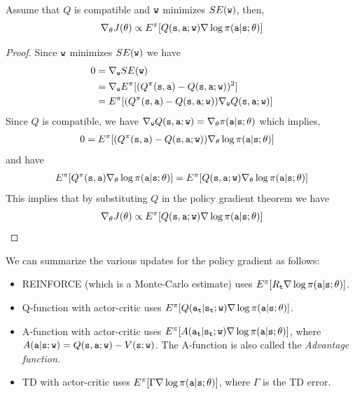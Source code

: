 \begin{theorem}
Assume that $Q$ is compatible and ${\tt w}$ minimizes $SE({\tt w})$,
then,
\[
\nabla_\theta J(\theta)\propto E^\pi[Q({\tt s},{\tt a};{\tt w})
\nabla \log \pi({\tt a}|{\tt s};\theta)]
\]
\end{theorem}

\begin{proof}
Since ${\tt w}$ minimizes $SE({\tt w})$ we have
\begin{align*}
0 & = \nabla_{\tt w} SE({\tt w})\\
&= \nabla_{\tt w} E^\pi[(Q^\pi({\tt s},{\tt a})-Q({\tt s},{\tt a};{\tt w}))^2]\\
&=
E^\pi[(Q^\pi({\tt s},{\tt a})-Q({\tt s},{\tt a};{\tt w}))\nabla_{\tt w}
Q({\tt s},{\tt a};{\tt w})]
\end{align*}
Since $Q$ is compatible, we have $\nabla_{\tt w}
Q({\tt s},{\tt a};{\tt w})= \nabla_\theta
\pi({\tt a}|{\tt s};\theta)$ which implies,
\begin{align*}
0&=
E^\pi[(Q^\pi({\tt s},{\tt a})-Q({\tt s},{\tt a};{\tt w}))\nabla_\theta
\log \pi({\tt a}|{\tt s};\theta)]
\end{align*}
and have
\begin{align*}
 E^\pi[Q^\pi({\tt s},{\tt a})\nabla_\theta \log \pi({\tt a}|{\tt s};\theta)] = E^\pi[Q({\tt s},{\tt a};{\tt w})\nabla_\theta \log \pi({\tt a}|{\tt s};\theta)]
\end{align*}
This implies that by substituting $Q$ in the policy gradient theorem
we have
\[
\nabla_\theta J(\theta) \propto E^\pi[Q({\tt s},{\tt a};{\tt w})
\nabla \log \pi({\tt a}|{\tt s};\theta)]
\]
\end{proof}

We can summarize the various updates for the policy gradient as
follows:
\begin{itemize}
\item REINFORCE (which is a Monte-Carlo estimate) uses
$E^\pi[R_{\tt t} \nabla\log\pi({\tt a}|{\tt s};\theta) ]$.
\item Q-function with actor-critic uses
$E^\pi[Q({\tt a}_{\tt t}|{\tt s}_{\tt t};{\tt w})
\nabla\log\pi({\tt a}|{\tt s};\theta) ]$.
\item A-function with actor-critic uses
$E^\pi[A({\tt a}_{\tt t}|{\tt s}_{\tt t};{\tt w})
\nabla\log\pi({\tt a}|{\tt s};\theta) ]$, where
$A({\tt a}|{\tt s};{\tt w})=Q({\tt s},{\tt a};{\tt w})-V({\tt s};{\tt w})$. The A-function is also called the \emph{Advantage function}.
\item TD with actor-critic uses
$E^\pi[\Gamma\nabla\log\pi({\tt a}|{\tt s};\theta) ]$, where
$\Gamma$ is the TD error.
\end{itemize}


